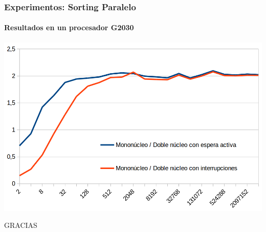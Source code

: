 \documentclass{beamer}
\begin{document}

\begin{frame}
  \frametitle{Experimentos: Sorting Paralelo}
  \framesubtitle{Resultados en un procesador G2030}
  \begin{center}
  \includegraphics[scale=0.3]{images/grafico.png}
  \end{center}
\end{frame}

\begin{frame}
  \begin{center}
  \huge GRACIAS
  \end{center}
\end{frame}
\end{document}
